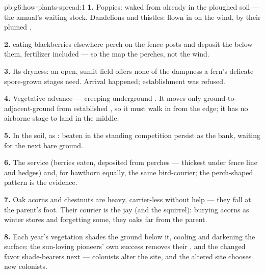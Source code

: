 \begin{solution}{pb:g6:how-plants-spread:1}
\textbf{1.} Poppies: waked from  already in the
ploughed soil --- the annual's waiting stock. Dandelions and
thistles: flown in on the wind, by their plumed .

\textbf{2.}  eating blackberries elsewhere perch on the
fence posts and deposit the  below them, fertilizer
included --- so the  map the perches, not the wind.

\textbf{3.} Its dryness: an open, sunlit field offers none
of the dampness a fern's delicate spore-grown stages need.
Arrival happened; establishment was refused.

\textbf{4.} Vegetative advance --- creeping underground
. It moves only ground-to-adjacent-ground from
established , so it must walk in from the edge; it has
no airborne stage to land in the middle.

\textbf{5.} In the soil, as :  beaten in the
standing competition persist as the  bank, waiting for
the next bare ground.

\textbf{6.} The  service (berries eaten,
 deposited from perches --- thickest under fence line
and hedges) and, for hawthorn equally, the same
bird-courier; the perch-shaped pattern is the evidence.

\textbf{7.} Oak acorns and chestnuts are heavy, carrier-less
without help --- they fall at the parent's foot. Their
courier is the jay (and the squirrel): burying acorns as
winter stores and forgetting some, they  oaks far from
the parent.

\textbf{8.} Each year's vegetation shades the ground below
it, cooling and darkening the surface: the sun-loving
pioneers' own success removes their , and the
changed  favor shade-bearers next --- colonists
alter the site, and the altered site chooses new colonists.


\end{solution}

